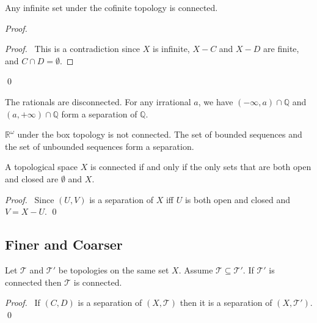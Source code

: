 \begin{ex}
Any infinite set under the cofinite topology is connected.
\end{ex}

\begin{proof}
\pf
{}
\qedstep
\begin{proof}
	\pf\ This is a contradiction since $X$ is infinite, $X - C$ and $X - D$ are finite, and $C \cap D = \emptyset$.
\end{proof}
\qed
\end{proof}

\begin{ex}
The rationals are disconnected. For any irrational $a$, we have $(- \infty, a) \cap \mathbb{Q}$ and $(a, +\infty) \cap \mathbb{Q}$ form a separation of $\mathbb{Q}$.
\end{ex}

\begin{ex}
$\mathbb{R}^\omega$ under the box topology is not connected. The set of bounded sequences and the set of unbounded sequences form a separation.
\end{ex}

\begin{prop}
A topological space $X$ is connected if and only if the only sets that are both open and closed are $\emptyset$ and $X$.
\end{prop}

\begin{proof}
\pf\ Since $(U,V)$ is a separation of $X$ iff $U$ is both open and closed and $V = X - U$. \qed
\end{proof}

\subsection{Finer and Coarser}

\begin{prop}
Let $\mathcal{T}$ and $\mathcal{T}'$ be topologies on the same set $X$. Assume $\mathcal{T} \subseteq \mathcal{T}'$. If $\mathcal{T}'$ is connected then $\mathcal{T}$ is connected.
\end{prop}

\begin{proof}
\pf\ If $(C,D)$ is a separation of $(X, \mathcal{T})$ then it is a separation of $(X, \mathcal{T}')$. \qed
\end{proof}

